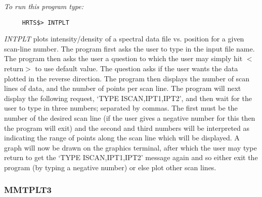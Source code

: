 {\em To run this program type:}
\begin{verbatim}
     HRTS$> INTPLT                       
\end{verbatim}
  {\em INTPLT} plots intensity/density of a spectral data file vs. position
   for a given scan-line number.  The program first asks the user to type
   in the input file name.  The program then asks the user a question
   to which the user may simply hit $<$return$>$ to use default value.  The
   question asks if the user wants the data plotted in the reverse
   direction. The program then displays the number of scan lines of data, and 
the number
   of points per scan line.  The program will next display the following
   request, `TYPE ISCAN,IPT1,IPT2',  and then wait for the user to type in
   three numbers; separated by commas. The first must be the number of the 
desired scan line
  (if the user gives a negative number for this then the program will
   exit) and the second and third numbers will be interpreted as
   indicating the range of points along the scan line which will be
   displayed.  A graph will now be drawn on the graphics terminal, after
   which the user may type return to get the `TYPE ISCAN,IPT1,IPT2'
   message again and so either exit the program (by typing a negative
   number) or else plot other scan lines.

\subsubsection{MMTPLT3}

